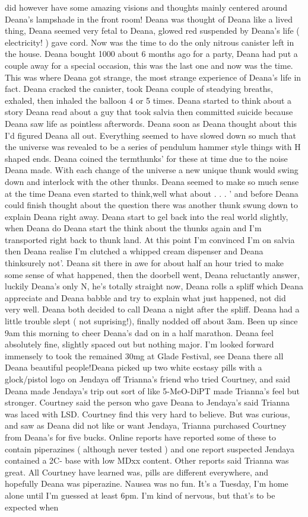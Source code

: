 \documentclass[12pt]{book}
\begin{document}
did however have some amazing visions and thoughts mainly centered around Deana's lampshade in the front room! Deana was thought of Deana like a lived thing, Deana seemed very fetal to Deana, glowed red suspended by Deana's life ( electricity! ) gave cord. Now was the time to do the only nitrous canister left in the house. Deana bought 1000 about 6 months ago for a party, Deana had put a couple away for a special occasion, this was the last one and now was the time. This was where Deana got strange, the most strange experience of Deana's life in fact. Deana cracked the canister, took Deana couple of steadying breaths, exhaled, then inhaled the balloon 4 or 5 times. Deana started to think about a story Deana read about a guy that took salvia then committed suicide because Deana saw life as pointless afterwords. Deana soon as Deana thought about this I'd figured Deana all out. Everything seemed to have slowed down so much that the universe was revealed to be a series of pendulum hammer style things with H shaped ends. Deana coined the termthunks' for these at time due to the noise Deana made. With each change of the universe a new unique thunk would swing down and interlock with the other thunks. Deana seemed to make so much sense at the time Deana even started to think,well what about . . .  ' and before Deana could finish thought about the question there was another thunk swung down to explain Deana right away. Deana start to gel back into the real world slightly, when Deana do Deana start the think about the thunks again and I'm transported right back to thunk land. At this point I'm convinced I'm on salvia then Deana realise I'm clutched a whipped cream dispenser and Deana thinksurely not'. Deana sit there in awe for about half an hour tried to make some sense of what happened, then the doorbell went, Deana reluctantly answer, luckily Deana's only N, he's totally straight now, Deana rolls a spliff which Deana appreciate and Deana babble and try to explain what just happened, not did very well. Deana both decided to call Deana a night after the spliff. Deana had a little trouble slept ( not suprising!), finally nodded off about 3am. Been up since 9am this morning to cheer Deana's dad on in a half marathon. Deana feel absolutely fine, slightly spaced out but nothing major. I'm looked forward immensely to took the remained 30mg at Glade Festival, see Deana there all Deana beautiful people!Deana picked up two white ecstasy pills with a glock/pistol logo on Jendaya off Trianna's friend who tried Courtney, and said Deana made Jendaya's trip out sort of like 5-MeO-DiPT made Trianna's feel but stronger. Courtney said the person who gave Deana to Jendaya's said Trianna was laced with LSD. Courtney find this very hard to believe. But was curious, and saw as Deana did not like or want Jendaya, Trianna purchased Courtney from Deana's for five bucks. Online reports have reported some of these to contain piperazines ( although never tested ) and one report suspected Jendaya contained a 2C- base with low MDxx content. Other reports said Trianna was great. All Courtney have learned was, pills are different everywhere, and hopefully Deana was piperazine. Nausea was no fun. It's a Tuesday, I'm home alone until I'm guessed at least 6pm. I'm kind of nervous, but that's to be expected when 
\end{document}
